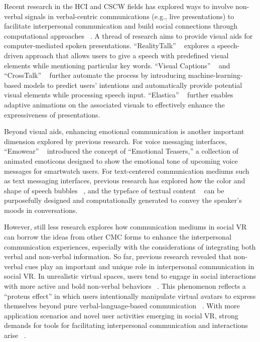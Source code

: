 Recent research in the HCI and CSCW fields has explored ways to involve non-verbal signals in verbal-centric communications (e.g., live presentations) to facilitate interpersonal communication and build social connections through computational approaches ~\cite{liao2022realitytalk, liu2023visual, cao2024elastica, an2024emowear, chen2021bubble, aoki2022emoballoon, choi2019emotype}.
A thread of research aims to provide visual aids for computer-mediated spoken presentations. ``RealityTalk'' ~\cite{liao2022realitytalk} explores a speech-driven approach that allows users to give a speech with predefined visual elements while mentioning particular key words. ``Visual Captions'' ~\cite{liu2023visual} and ``CrossTalk'' ~\cite{xia2023crosstalk} further automate the process by introducing machine-learning-based models to predict users' intentions and automatically provide potential visual elements while processing speech input. ``Elastica'' ~\cite{cao2024elastica} further enables adaptive animations on the associated visuals to effectively enhance the expressiveness of presentations.

Beyond visual aids, enhancing emotional communication is another important dimension explored by previous research. For voice messaging interfaces, ``Emowear'' ~\cite{an2024emowear} introduced the concept of ``Emotional Teasers,'' a collection of animated emoticons designed to show the emotional tone of upcoming voice messages for smartwatch users.
For text-centered communication mediums such as text messaging interfaces, previous research has explored how the color and shape of speech bubbles ~\cite{chen2021bubble, aoki2022emoballoon}, and the typeface of textual content ~\cite{choi2019emotype, de2023visualization} can be purposefully designed and computationally generated to convey the speaker's moods in conversations. 

However, still less research explores how communication mediums in social VR can borrow the ideas from other CMC forms to enhance the interpersonal communication experiences, especially with the considerations of integrating both verbal and non-verbal information.
So far, previous research revealed that non-verbal cues play an important and unique role in interpersonal communication in social VR.
In unrealistic virtual spaces, users tend to engage in social interactions with more active and bold non-verbal behaviors ~\cite{maloney2020falling, chen2024drink}. 
This phenomenon reflects a ``proteus effect'' in which users intentionally manipulate virtual avatars to express themselves beyond pure verbal-language-based communication ~\cite{maloney2020talking}. 
With more application scenarios and novel user activities emerging in social VR, strong demands for tools for facilitating interpersonal communication and interactions arise ~\cite{tanenbaum2020make}.


